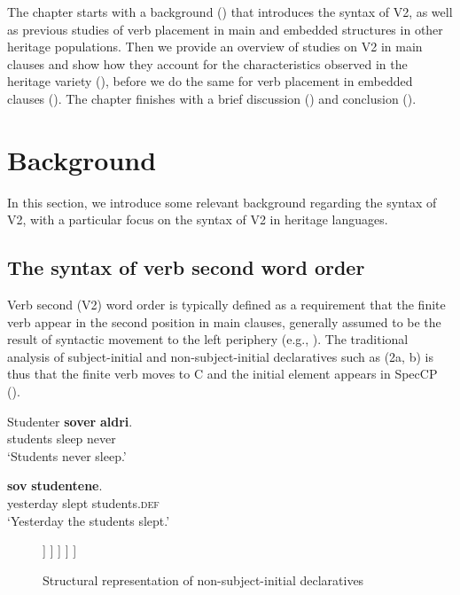 \documentclass[output=paper]{langscibook}
\begin{document}
The chapter starts with a background () that introduces the syntax of V2, as well as previous studies of verb placement in main and embedded structures in other heritage populations. Then we provide an overview of studies on V2 in main clauses and show how they account for the characteristics observed in the heritage variety (), before we do the same for verb placement in embedded clauses (). The chapter finishes with a brief discussion () and conclusion ().

\section{Background}
\label{sec:anderssen:2}
In this section, we introduce some relevant background regarding the syntax of V2, with a particular focus on the syntax of V2 in heritage languages.

\subsection{The syntax of verb second word order}
\label{sec:anderssen:2.1}
Verb second (V2) word order is typically defined as a requirement that the finite verb appear in the second position in main clauses, generally assumed to be the result of syntactic movement to the left periphery (e.g., \citealt{DenBesten1983, HolmbergPlatzack1995, Vikner1995}). The traditional analysis of subject\hyp initial and non\hyp subject\hyp initial declaratives such as (2a, b) is thus that the finite verb moves to C and the initial element appears in SpecCP ().

\ea%
    \label{ex:anderssen:2}
	\ea \label{ex:anderssen:2a}
	\gll Studenter \textbf{sover} \textbf{aldri}.\\
	students sleep never\\
	\glt `Students never sleep.’

	\ex \label{ex:anderssen:2b}
	   \textbf{sov} \textbf{studentene}.\\
		  yesterday slept students.\textsc{def}\\
	\glt  ‘Yesterday the students slept.’
	\z
\z


\begin{figure}[h]
\caption{Structural representation of non-subject-initial declaratives}
\label{fig:anderssen:fromex:2c}
\begin{forest}
[CP
    [DP\\\textit{I går}]    
    [C’
		[C\\\textit{sov}]    
		[TP
			[DP\\\textit{studentene}]
			[T'
				[T\\\sout{\textit{sov}}]
				[\textit{v}P 
                  [\sout{\textit{studentene sov i går}},roof] 
				]
			]
		]
	]
]
\end{forest}
\end{figure}
\end{document}
